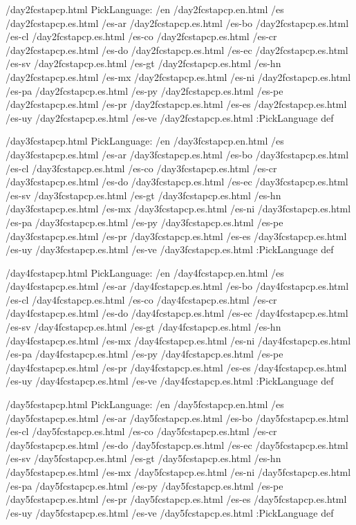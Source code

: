 \begin{ingrid}
/day2fcstapcp.html {
PickLanguage:
/en /day2fcstapcp.en.html
/es /day2fcstapcp.es.html
/es-ar /day2fcstapcp.es.html
/es-bo /day2fcstapcp.es.html
/es-cl /day2fcstapcp.es.html
/es-co /day2fcstapcp.es.html
/es-cr /day2fcstapcp.es.html
/es-do /day2fcstapcp.es.html
/es-ec /day2fcstapcp.es.html
/es-sv /day2fcstapcp.es.html
/es-gt /day2fcstapcp.es.html
/es-hn /day2fcstapcp.es.html
/es-mx /day2fcstapcp.es.html
/es-ni /day2fcstapcp.es.html
/es-pa /day2fcstapcp.es.html
/es-py /day2fcstapcp.es.html
/es-pe /day2fcstapcp.es.html
/es-pr /day2fcstapcp.es.html
/es-es /day2fcstapcp.es.html
/es-uy /day2fcstapcp.es.html
/es-ve /day2fcstapcp.es.html
:PickLanguage
} def

/day3fcstapcp.html {
PickLanguage:
/en /day3fcstapcp.en.html
/es /day3fcstapcp.es.html
/es-ar /day3fcstapcp.es.html
/es-bo /day3fcstapcp.es.html
/es-cl /day3fcstapcp.es.html
/es-co /day3fcstapcp.es.html
/es-cr /day3fcstapcp.es.html
/es-do /day3fcstapcp.es.html
/es-ec /day3fcstapcp.es.html
/es-sv /day3fcstapcp.es.html
/es-gt /day3fcstapcp.es.html
/es-hn /day3fcstapcp.es.html
/es-mx /day3fcstapcp.es.html
/es-ni /day3fcstapcp.es.html
/es-pa /day3fcstapcp.es.html
/es-py /day3fcstapcp.es.html
/es-pe /day3fcstapcp.es.html
/es-pr /day3fcstapcp.es.html
/es-es /day3fcstapcp.es.html
/es-uy /day3fcstapcp.es.html
/es-ve /day3fcstapcp.es.html
:PickLanguage
} def

/day4fcstapcp.html {
PickLanguage:
/en /day4fcstapcp.en.html
/es /day4fcstapcp.es.html
/es-ar /day4fcstapcp.es.html
/es-bo /day4fcstapcp.es.html
/es-cl /day4fcstapcp.es.html
/es-co /day4fcstapcp.es.html
/es-cr /day4fcstapcp.es.html
/es-do /day4fcstapcp.es.html
/es-ec /day4fcstapcp.es.html
/es-sv /day4fcstapcp.es.html
/es-gt /day4fcstapcp.es.html
/es-hn /day4fcstapcp.es.html
/es-mx /day4fcstapcp.es.html
/es-ni /day4fcstapcp.es.html
/es-pa /day4fcstapcp.es.html
/es-py /day4fcstapcp.es.html
/es-pe /day4fcstapcp.es.html
/es-pr /day4fcstapcp.es.html
/es-es /day4fcstapcp.es.html
/es-uy /day4fcstapcp.es.html
/es-ve /day4fcstapcp.es.html
:PickLanguage
} def

/day5fcstapcp.html {
PickLanguage:
/en /day5fcstapcp.en.html
/es /day5fcstapcp.es.html
/es-ar /day5fcstapcp.es.html
/es-bo /day5fcstapcp.es.html
/es-cl /day5fcstapcp.es.html
/es-co /day5fcstapcp.es.html
/es-cr /day5fcstapcp.es.html
/es-do /day5fcstapcp.es.html
/es-ec /day5fcstapcp.es.html
/es-sv /day5fcstapcp.es.html
/es-gt /day5fcstapcp.es.html
/es-hn /day5fcstapcp.es.html
/es-mx /day5fcstapcp.es.html
/es-ni /day5fcstapcp.es.html
/es-pa /day5fcstapcp.es.html
/es-py /day5fcstapcp.es.html
/es-pe /day5fcstapcp.es.html
/es-pr /day5fcstapcp.es.html
/es-es /day5fcstapcp.es.html
/es-uy /day5fcstapcp.es.html
/es-ve /day5fcstapcp.es.html
:PickLanguage
} def


\end{ingrid}
